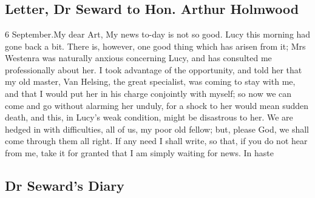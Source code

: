 \chapter[Chapter \thechapter]{}

\section{Letter, Dr Seward to Hon. Arthur Holmwood}

\begin{mail}{6 September.}{My dear Art,}
My news to-day is not so good. Lucy this morning had gone back a bit. There is, however, one good thing which has arisen from it; Mrs Westenra was naturally anxious concerning Lucy, and has consulted me professionally about her. I took advantage of the opportunity, and told her that my old master, Van Helsing, the great specialist, was coming to stay with me, and that I would put her in his charge conjointly with myself; so now we can come and go without alarming her unduly, for a shock to her would mean sudden death, and this, in Lucy's weak condition, might be disastrous to her. We are hedged in with difficulties, all of us, my poor old fellow; but, please God, we shall come through them all right. If any need I shall write, so that, if you do not hear from me, take it for granted that I am simply waiting for news. In haste

\end{mail}

\section{Dr Seward's Diary}

